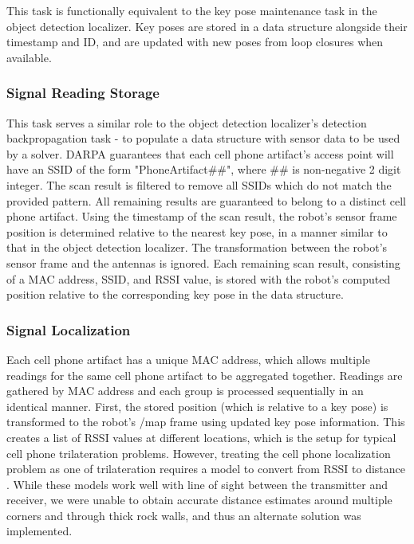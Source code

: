 This task is functionally equivalent to the key pose maintenance task in the object detection localizer. Key poses are stored in a data structure alongside their timestamp and ID, and are updated with new poses from loop closures when available.

\subsubsection{Signal Reading Storage}

This task serves a similar role to the object detection localizer's detection backpropagation task - to populate a data structure with sensor data to be used by a solver. DARPA guarantees that each cell phone artifact's access point will have an SSID of the form "PhoneArtifact\#\#", where \#\# is non-negative 2 digit integer. The scan result is filtered to remove all SSIDs which do not match the provided pattern. All remaining results are guaranteed to belong to a distinct cell phone artifact. Using the timestamp of the scan result, the robot's sensor frame position is determined relative to the nearest key pose, in a manner similar to that in the object detection localizer. The transformation between the robot's sensor frame and the antennas is ignored. Each remaining scan result, consisting of a MAC address, SSID, and RSSI value, is stored with the robot's computed position relative to the corresponding key pose in the data structure.

\subsubsection{Signal Localization} 

Each cell phone artifact has a unique MAC address, which allows multiple readings for the same cell phone artifact to be aggregated together. Readings are gathered by MAC address and each group is processed sequentially in an identical manner. First, the stored position (which is relative to a key pose) is transformed to the robot's /map frame using updated key pose information. This creates a list of RSSI values at different locations, which is the setup for typical cell phone trilateration problems. However, treating the cell phone localization problem as one of trilateration requires a model to convert from RSSI to distance \cite{iglesias2012indoor}. While these models work well with line of sight between the transmitter and receiver, we were unable to obtain accurate distance estimates around multiple corners and through thick rock walls, and thus an alternate solution was implemented.
	
